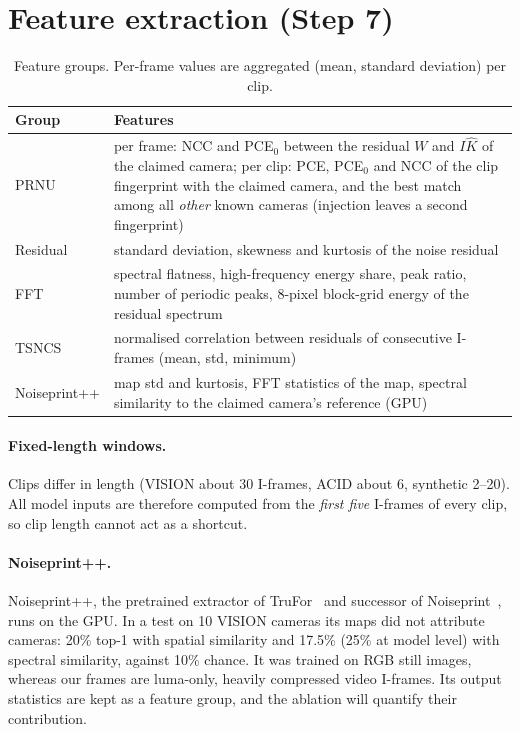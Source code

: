 \documentclass[11pt,a4paper]{article}
\begin{document}
\section{Feature extraction (Step 7)}

\begin{table}[H]
\centering\small
\caption{Feature groups. Per-frame values are aggregated (mean, standard deviation) per clip.}
\label{tab:features}
\begin{tabularx}{\linewidth}{lY}
\toprule
Group & Features \\
\midrule
PRNU & per frame: NCC and PCE$_0$ between the residual $W$ and $I\hat K$ of the claimed camera;
       per clip: PCE, PCE$_0$ and NCC of the clip fingerprint with the claimed camera, and the best
       match among all \emph{other} known cameras (injection leaves a second fingerprint) \\
Residual & standard deviation, skewness and kurtosis of the noise residual \\
FFT & spectral flatness, high-frequency energy share, peak ratio, number of periodic peaks, 8-pixel
      block-grid energy of the residual spectrum \\
TSNCS & normalised correlation between residuals of consecutive I-frames (mean, std, minimum) \\
Noiseprint++ & map std and kurtosis, FFT statistics of the map, spectral similarity to the claimed
      camera's reference (GPU) \\
\bottomrule
\end{tabularx}
\end{table}

\paragraph{Fixed-length windows.} Clips differ in length (VISION about 30 I-frames, ACID about 6,
synthetic 2--20). All model inputs are therefore computed from the \emph{first five} I-frames of every
clip, so clip length cannot act as a shortcut.

\paragraph{Noiseprint++.} Noiseprint++, the pretrained extractor of TruFor~\cite{trufor} and successor of
Noiseprint~\cite{noiseprint}, runs on the GPU. In a test on 10 VISION cameras its maps did not
attribute cameras: 20\% top-1 with spatial similarity and 17.5\% (25\% at model level) with spectral
similarity, against 10\% chance. It was trained on RGB still images, whereas our frames are luma-only,
heavily compressed video I-frames. Its output statistics are kept as a feature group, and the
ablation will quantify their contribution.
\end{document}

